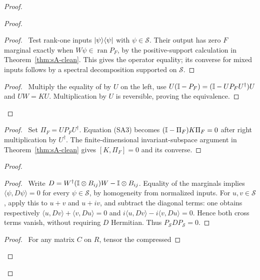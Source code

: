 \begin{proof}
 \begin{proof}
  \begin{proof}\pf\ Test rank-one inputs $\lvert \psi\rangle\langle \psi\rvert$ with
  $\psi\in\mathcal S$. Their output has zero $F$ marginal exactly
  when $W\psi\in\operatorname{ran}P_F$, by the positive-support
  calculation in Theorem~\ref{thm:sA-clean}. This gives the operator
  equality; its converse for mixed inputs follows by a spectral
  decomposition supported on $\mathcal S$.
  \end{proof}
  \qedstep
  \begin{proof}\pf\ Multiply the equality of
   by $U$ on the left, use
  $U(\mathbb{I}-P_F)=(\mathbb{I}-UP_FU^\dagger)U$ and $UW=KU$.
  Multiplication by $U$ is reversible, proving the equivalence.
  \end{proof}
 \end{proof}
 \begin{proof}\pf\ Set $\Pi_F=UP_FU^\dagger$. Equation (SA3)
 becomes $(\mathbb{I}-\Pi_F)K\Pi_F=0$ after right multiplication by
 $U^\dagger$. The finite-dimensional invariant-subspace argument in
 Theorem~\ref{thm:sA-clean} gives $[K,\Pi_F]=0$ and its converse.
 \end{proof}
 \begin{proof}
  \begin{proof}\pf\ Write
  $D=W^\dagger(\mathbb{I}\otimes B_{ij})W-\mathbb{I}\otimes B_{ij}$.
  Equality of the marginals implies $\langle\psi,D\psi\rangle=0$
  for every $\psi\in\mathcal S$, by homogeneity from normalized
  inputs. For $u,v\in\mathcal S$, apply this to $u+v$ and $u+iv$,
  and subtract the diagonal terms: one obtains respectively
  $\langle u,Dv\rangle+\langle v,Du\rangle=0$ and
  $i\langle u,Dv\rangle-i\langle v,Du\rangle=0$.
  Hence both cross terms vanish, without requiring $D$ Hermitian.
  Thus $P_{\mathcal S}DP_{\mathcal S}=0$.
  \end{proof}
  \begin{proof}\pf\ For any matrix $C$ on $R$, tensor the compressed

\end{proof}
\end{proof}
\end{proof}
